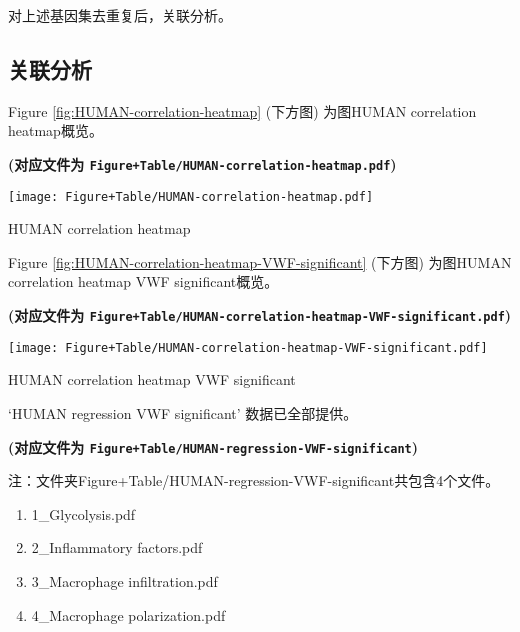 \documentclass[
]{article}
\providecommand{\tightlist}{%
  \setlength{\itemsep}{0pt}\setlength{\parskip}{0pt}}
\begin{document}
对上述基因集去重复后，关联分析。

\hypertarget{ux5173ux8054ux5206ux6790}{%
\subsection{关联分析}\label{ux5173ux8054ux5206ux6790}}

Figure \ref{fig:HUMAN-correlation-heatmap} (下方图) 为图HUMAN correlation heatmap概览。

\textbf{(对应文件为 \texttt{Figure+Table/HUMAN-correlation-heatmap.pdf})}

\def\@captype{figure}
\begin{center}
\texttt{[image: Figure+Table/HUMAN-correlation-heatmap.pdf]}
\caption{HUMAN correlation heatmap}\label{fig:HUMAN-correlation-heatmap}
\end{center}

Figure \ref{fig:HUMAN-correlation-heatmap-VWF-significant} (下方图) 为图HUMAN correlation heatmap VWF significant概览。

\textbf{(对应文件为 \texttt{Figure+Table/HUMAN-correlation-heatmap-VWF-significant.pdf})}

\def\@captype{figure}
\begin{center}
\texttt{[image: Figure+Table/HUMAN-correlation-heatmap-VWF-significant.pdf]}
\caption{HUMAN correlation heatmap VWF significant}\label{fig:HUMAN-correlation-heatmap-VWF-significant}
\end{center}

`HUMAN regression VWF significant' 数据已全部提供。

\textbf{(对应文件为 \texttt{Figure+Table/HUMAN-regression-VWF-significant})}

\begin{center}\begin{tcolorbox}[colback=gray!10, colframe=gray!50, width=0.9\linewidth, arc=1mm, boxrule=0.5pt]注：文件夹Figure+Table/HUMAN-regression-VWF-significant共包含4个文件。

\begin{enumerate}\tightlist
\item 1\_Glycolysis.pdf
\item 2\_Inflammatory factors.pdf
\item 3\_Macrophage infiltration.pdf
\item 4\_Macrophage polarization.pdf
\end{enumerate}\end{tcolorbox}
\end{center}
\end{document}
